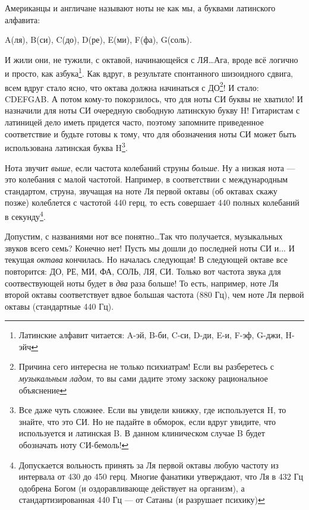 Американцы и англичане называют ноты не как мы, а буквами латинского алфавита: 
\begin{center}
    A(ля), B(си), C(до), D(ре), E(ми), F(фа), G(соль).
\end{center}

И жили они, не тужили, с октавой, начинающейся с ЛЯ\ldots Ага, вроде всё логично и просто, как азбука\footnote{Латинские алфавит читается: A-эй, B-би, C-си, D-ди, E-и, F-эф, G-джи, H-эйч}. Как вдруг, в результате спонтанного шизоидного сдвига, всем вдруг стало ясно, что октава должна начинаться с ДО\footnote{Причина сего интересна не только психиатрам! Если вы разберетесь с \emph{музыкальным ладом}, то вы сами дадите этому заскоку рациональное объяснение}! И стало: CDEFGAB. А потом кому-то покорзилось, что для ноты СИ буквы не хватило! И назначили для ноты СИ очередную свободную латинскую букву H! Гитаристам с латиницей дело иметь придется часто, поэтому запомните приведенное соответствие и будьте готовы к тому, что для обозначения ноты СИ может быть использована латинская буква H\footnote{Все даже чуть сложнее. Если вы увидели книжку, где используется H, то знайте, что это СИ. Но не падайте в обморок, если вдруг увидите, что используется и латинская B. В данном клиническом случае B будет обозначать ноту CИ-бемоль!}.

Нота звучит \emph{выше}, если частота колебаний струны \emph{больше}. Ну а низкая нота --- это колебания с малой частотой. Например, в соответствии с международным стандартом, струна, звучащая на ноте Ля первой октавы (об октавах скажу позже) колеблется с частотой 440 герц, то есть совершает 440 полных колебаний в секунду\footnote{Допускается вольность принять за Ля первой октавы любую частоту из интервала от 430 до 450 герц. Многие фанатики утверждают, что Ля в 432 Гц одобрена Богом (и оздоравливающе действует на организм), а стандартизированная 440 Гц --- от Сатаны (и разрушает психику)}.

Допустим, с названиями нот все понятно\ldots Так что получается, музыкальных звуков всего семь? Конечно нет! Пусть мы дошли до последней ноты СИ и... И текущая \emph{октава} кончилась. Но началась следующая! В следующей октаве все повторится: ДО, РЕ, МИ, ФА, СОЛЬ, ЛЯ, СИ. Только вот частота звука для соотвествующей ноты будет в \emph{два} раза больше! То есть, например, ноте Ля второй октавы соответствует вдвое большая частота (880 Гц), чем ноте Ля первой октавы (стандартные 440 Гц).

